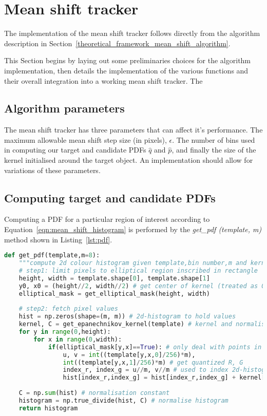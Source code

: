 \section{Mean shift tracker}\label{implementation_mean_shift_tracker}
The implementation of the mean shift tracker follows directly from the algorithm
description in Section~\ref{theoretical_framework_mean_shift_algorithm}.

This Section begins by laying out some preliminaries choices for the algorithm
implementation, then details the implementation of the various functions and
their overall integration into a working mean shift tracker. The  

\subsection{Algorithm parameters}
The mean shift tracker has three parameters that can affect it's performance.
The maximum allowable mean shift step size (in pixels), $\epsilon$. The number
of bins used in computing our target and candidate PDFs $\hat{q}$ and
$\hat{p}$, and finally the size of the kernel initialised around the target
object.
An implementation should allow for variations of these parameters.

\subsection{Computing target and candidate PDFs}
Computing a PDF for a particular region of interest according to 
Equation~\ref{eqn:mean_shift_histogram} is performed by the \textit{get\_pdf
(template, m)} method shown in Listing~\ref{lst:pdf}.

\begin{lstlisting}[language=Python, caption={Function computing the PDF}, captionpos=b, label={lst:pdf}]
def get_pdf(template,m=8):
    """compute 2d colour histogram given template,bin number,m and kernel function"""
    # step1: limit pixels to elliptical region inscribed in rectangle
    height, width = template.shape[0], template.shape[1]
    y0, x0 = (height//2, width//2) # get center of kernel (treated as 0,0) == hy and hx 
    elliptical_mask = get_elliptical_mask(height, width)
       
    # step2: fetch pixel values
    hist = np.zeros(shape=(m, m)) # 2d-histogram to hold values 
    kernel, C = get_epanechnikov_kernel(template) # kernel and normalisation constant, C
    for y in range(0,height):
        for x in range(0,width): 
            if(elliptical_mask[y,x]==True): # only deal with points in the mask
                u, v = int((template[y,x,0]/256)*m),
                int((template[y,x,1]/256)*m) # get quantized R, G
                index_r, index_g = u//m, v//m # used to index 2d-histogram
                hist[index_r,index_g] = hist[index_r,index_g] + kernel[y,x] # add weighted point
    
    C = np.sum(hist) # normalisation constant
    histogram = np.true_divide(hist, C) # normalise histogram
    return histogram 
\end{lstlisting}

